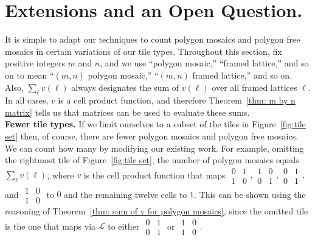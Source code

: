 \documentclass[12pt]{article}
\theoremstyle{plain}
\theoremstyle{remark}
\theoremstyle{definition}
\theoremstyle{remark}
\theoremstyle{definition}
\begin{document}
\section{Extensions and an Open Question.}\label{section: extensions}

It is simple to adapt our techniques to count polygon mosaics and polygon free mosaics in certain variations of our tile types. Throughout this section, fix positive integers $m$ and $n$, and we use ``polygon mosaic,'' ``framed lattice,'' and so on to mean ``$(m,n)$ polygon mosaic,'' ``$(m,n)$ framed lattice,'' and so on. Also, $\sum_{\ell}v(\ell)$ always designates the sum of $v(\ell)$ over all framed lattices $\ell$. In all cases, $v$ is a cell product function, and therefore Theorem~\ref{thm: m by n matrix} tells us that matrices can be used to evaluate these sums.
\\

\noindent \textbf{Fewer tile types.} If we limit ourselves to a subset of the tiles in Figure~\ref{fig:tile set} then, of course, there are fewer polygon mosaics and polygon free mosaics. We can count how many by modifying our existing work. For example, omitting the rightmost tile of Figure~\ref{fig:tile set}, the number of polygon mosaics equals $\sum_{\ell}v(\ell)$, where $v$ is the cell product function that maps $\begin{smallmatrix}0&1\\ 1&0\end{smallmatrix}, \begin{smallmatrix}1&0\\ 0&1\end{smallmatrix}, \begin{smallmatrix}0&1\\ 0&1\end{smallmatrix},$ and $\begin{smallmatrix}1&0\\ 1&0\end{smallmatrix}$ to $0$ and the remaining twelve cells to $1$. This can be shown using the reasoning of Theorem~\ref{thm: sum of v for polygon mosaics}, since the omitted tile is the one that maps via $\mathscr{L}$ to either $\begin{smallmatrix}0&1\\ 0&1\end{smallmatrix}$ or $\begin{smallmatrix}1&0\\ 1&0\end{smallmatrix}$.
\end{document}
